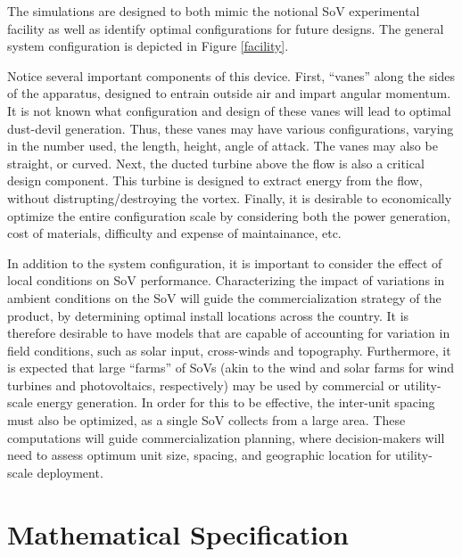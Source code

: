 \documentclass{article}
\begin{document}
The simulations are designed to both mimic the notional SoV experimental
facility as well as identify optimal configurations for future
designs. The general system configuration is depicted in Figure
\ref{facility}. 

Notice several important components of this device. First, ``vanes''
along the sides of the apparatus, designed to entrain outside air and
impart angular momentum. It is not known what configuration and design
of these vanes will lead to optimal dust-devil generation. Thus, these
vanes may have various configurations, varying in the number used, the
length, height, angle of attack. The vanes may also be straight, or
curved.  Next, the ducted turbine above the flow is also a critical design
component. This turbine is designed to extract energy from the flow,
without distrupting/destroying the vortex. Finally, it is desirable to
economically optimize the entire configuration scale by considering both
the power generation, cost of materials, difficulty and expense of
maintainance, etc. 

In addition to the system configuration, it is important to consider the
effect of local conditions on SoV performance. Characterizing the impact
of variations in ambient conditions on the SoV will guide the
commercialization strategy of the product, by determining optimal
install locations across the country. It is therefore desirable to have models
that are capable of accounting for variation in field conditions, such as solar
input, cross-winds and topography. Furthermore, it is expected that 
large ``farms'' of SoVs (akin to the wind and solar farms for wind
turbines 
and photovoltaics, respectively) may be used by commercial or
utility-scale energy generation. In order for this to be effective, 
the inter-unit spacing must also be optimized, as a single SoV collects
from a large area. These computations will guide commercialization
planning, where decision-makers will need to assess optimum unit size,
spacing, and geographic location for utility-scale deployment.  

%
%
%
\section{Mathematical Specification}
\end{document}
